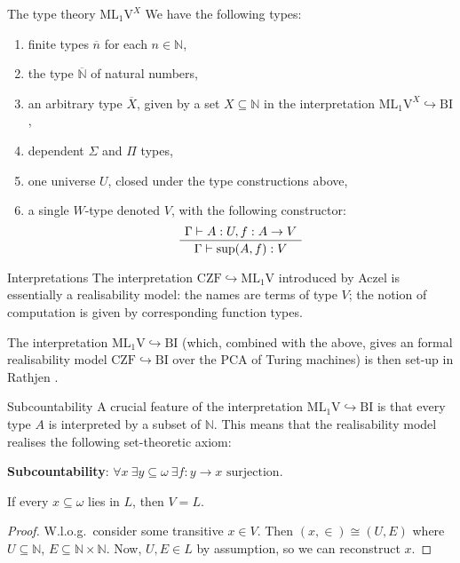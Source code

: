 \documentclass{beamer}
\theoremstyle{definition}
\newcommand{\CZF}{\mathrm{CZF}}
\begin{document}
\begin{frame}{The type theory $\mathrm{ML}_1\mathrm{V}^X$}
  We have the following types:
  \begin{enumerate}
    \item finite types $\overline{n}$ for each $n \in \mathbb{N}$,
    \item the type $\overline{\mathbb{N}}$ of natural numbers,
    \item an arbitrary type $\overline{X}$, given by a set $X \subseteq \mathbb{N}$ in the interpretation $\mathrm{ML}_1\mathrm{V}^X \hookrightarrow \mathrm{BI}$,
    \item dependent $\Sigma$ and $\Pi$ types,
    \item one universe $U$, closed under the type constructions above,
    \item a single $W$-type denoted $V$, with the following constructor:
          \[\AxiomC{$\Gamma \vdash A : U, f : A \rightarrow V$}
            \UnaryInfC{$\Gamma \vdash \mathrm{sup}\mleft(A, f\mright) : V$}
            \DisplayProof\]
  \end{enumerate}
\end{frame}

\begin{frame}{Interpretations}
  The interpretation $\CZF \hookrightarrow \mathrm{ML}_1\mathrm{V}$ introduced by Aczel \cite{aczel78-type-theoretic-cst} is essentially a realisability model: the names are terms of type $V$; the notion of computation is given by corresponding function types.

  \vspace{1em}

  The interpretation $\mathrm{ML}_1\mathrm{V} \hookrightarrow \mathrm{BI}$ (which, combined with the above, gives an formal realisability model $\CZF \hookrightarrow \mathrm{BI}$ over the PCA of Turing machines) is then set-up in Rathjen \cite{rathjen14-czf-lpo}.
\end{frame}

\begin{frame}{Subcountability}
  A crucial feature of the interpretation $\mathrm{ML}_1\mathrm{V} \hookrightarrow \mathrm{BI}$ is that every type $A$ is interpreted by a subset of $\mathbb{N}$. This means that the realisability model realises the following set-theoretic axiom:

  \vspace{0.6em}
  \textbf{Subcountability}: $\forall x \ \exists y \subseteq \omega \ \exists f : y \rightarrow x \text{ surjection}$.

  \pause

  \vspace{0.6em}
  \begin{corollary}[$\CZF + \text{Subcountability}$]
    If every $x \subseteq \omega$ lies in $L$, then $V = L$.
  \end{corollary}
  \begin{proof}
    W.l.o.g.\ consider some transitive $x \in V$. Then $\left(x, \in\right) \cong \left(U, E\right)$ where $U \subseteq \mathbb{N}$, $E \subseteq \mathbb{N} \times \mathbb{N}$. Now, $U, E \in L$ by assumption, so we can reconstruct $x$.
  \end{proof}
\end{frame}
\end{document}
